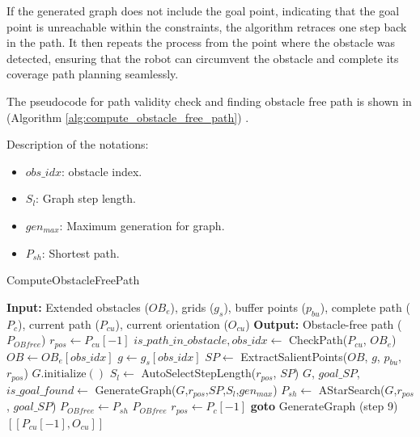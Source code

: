 If the generated graph does not include the goal point, indicating that the goal point is unreachable within the constraints, the algorithm retraces one step back in the path. It then repeats the process from the point where the obstacle was detected, ensuring that the robot can circumvent the obstacle and complete its coverage path planning seamlessly.

\vspace*{6mm}  

The pseudocode for path validity check and finding obstacle free path is shown in (Algorithm \autoref{alg:compute_obstacle_free_path}) .

\vspace*{6mm}  

Description of the notations:
\begin{multicols}{2}
\begin{itemize}[noitemsep,topsep=0pt]
    \item $obs\_idx$: obstacle index.
    \item $S_l$: Graph step length.
    \item $gen_{max}$: Maximum generation for graph.
    \item $P_{sh}$: Shortest path.
\end{itemize}
\end{multicols}

\begin{algorithm}[H]
    \caption{ComputeObstacleFreePath}
    \label{alg:compute_obstacle_free_path}
    \begin{algorithmic}[1]
    \Statex \textbf{Input:} Extended obstacles ($OB_e$), grids ($g_s$), buffer points ($p_{bu}$), complete path ($P_c$), current path ($P_{cu}$), current orientation ($O_{cu}$)
    \Statex \textbf{Output:} Obstacle-free path ($P_{OB free}$)
    \newline
    \State $r_{pos} \leftarrow P_{cu}[-1]$
    \State $is\_path\_in\_obstacle, obs\_idx \leftarrow$ CheckPath($P_{cu}$, $OB_e$)
        \State $OB\leftarrow OB_e[obs\_idx]$
        \State $g \leftarrow g_s[obs\_idx]$
        \State $SP \leftarrow$ ExtractSalientPoints($OB$, $g$, $p_{bu}$, $r_{pos}$)
        \State $G.\text{initialize}()$
        \State $S_l \leftarrow$ AutoSelectStepLength($r_{pos}$, $SP$)
        \State $G$, $goal\_SP$, $is\_goal\_found \leftarrow$ GenerateGraph($G$,$r_{pos}$,$SP$,$S_l$,$gen_{max}$)
            \State $P_{sh} \leftarrow$ AStarSearch($G$,$r_{pos}$, $goal\_SP$)
            \State $P_{OB free} \leftarrow P_{sh}$
            \State \Return $P_{OB free}$
        \Else
            \State $r_{pos} \leftarrow P_c[-1]$ 
            \State \textbf{goto} GenerateGraph (step 9)
        \EndIf
    \Else
        \State \Return $[[P_{cu}[-1], O_{cu}]]$
    \EndIf
    \end{algorithmic}
    \end{algorithm}


